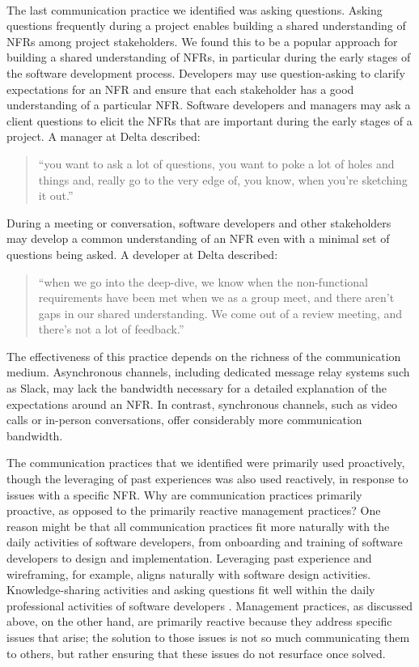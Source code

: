 \documentclass[smallextended]{svjour3}        %
\providecommand{\DIFaddtex}[1]{{\protect\color{blue}\uwave{#1}}} %
\providecommand{\DIFaddbegin}{} %
\providecommand{\DIFaddend}{} %
\providecommand{\DIFadd}[1]{\texorpdfstring{\DIFaddtex{#1}}{#1}} %
\newcommand{\DIFaddincludegraphics}[2][]{{\color{blue}\fbox{\DIFOincludegraphics[#1]{#2}}}} %
\DeclareRobustCommand{\DIFaddbegin}{\DIFOaddbegin \let\includegraphics\DIFaddincludegraphics} %
\DeclareRobustCommand{\DIFaddend}{\DIFOaddend \let\includegraphics\DIFOincludegraphics} %
\begin{document}
\DIFaddbegin \paragraph{\DIFadd{Asking questions}} \DIFaddend The last communication practice we identified was asking questions. 
Asking questions frequently during a project enables building a shared understanding of NFRs among project stakeholders. 
We found this to be a popular approach for building a shared understanding of NFRs, in particular during the early stages of the software development process. 
Developers may use question-asking to clarify expectations for an NFR and ensure that each stakeholder has a good understanding of a particular NFR. 
Software developers and managers may ask a client questions to elicit the NFRs that are important during the early stages of a project. A manager at Delta described:
\begin{quote}
    ``you want to ask a lot of questions, you want to poke a lot of holes and things and, really go to the very edge of, you know, when you’re sketching it out.''
\end{quote}
During a meeting or conversation, software developers and other stakeholders may develop a common understanding of an NFR even with a minimal set of questions being asked.
A developer at Delta described:
\begin{quote}
    ``when we go into the deep-dive, we know when the non-functional requirements have been met when we as a group meet, and there aren’t gaps in our shared understanding. We come out of a review meeting, and there’s not a lot of feedback.''
\end{quote}    
%
The effectiveness of this practice 
depends on the richness of the communication medium.
Asynchronous channels, including dedicated message relay systems such as Slack, may lack the bandwidth necessary for a detailed explanation of the expectations around an NFR.  
In contrast, synchronous channels, such as video calls or in-person conversations, offer considerably more communication bandwidth.


The communication practices that we identified were primarily used proactively, though the leveraging of past experiences was also used reactively, in response to issues with a specific NFR. Why are communication practices primarily proactive, as opposed to the primarily reactive management practices? 
One reason might be that all communication practices fit more naturally with the daily activities of software developers, from onboarding and training of software developers to design and implementation. Leveraging past experience and wireframing, for example, aligns naturally with software design activities. Knowledge-sharing activities and asking questions fit well within the daily professional activities of software developers \citep{meyer2019today,kautz2008knowledge}.
Management practices, as discussed above, on the other hand, are primarily reactive because they address specific issues that arise; the solution to those issues is not so much communicating them to others, but rather ensuring that these issues do not resurface once solved.
\end{document}
